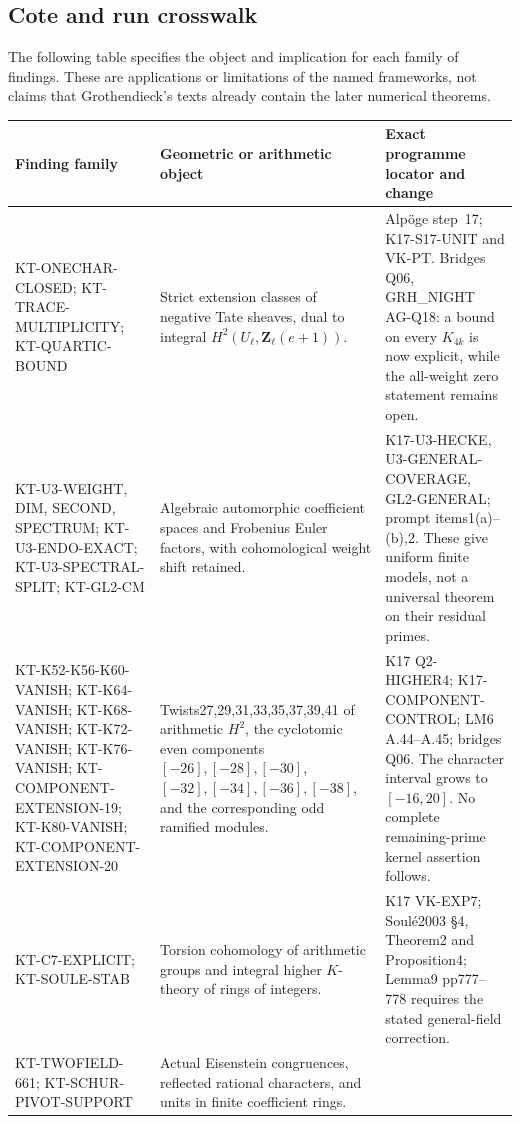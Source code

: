 \documentclass[11pt,a4paper]{article}
\theoremstyle{definition}
\begin{document}
\subsection{Cote and run crosswalk}

The following table specifies the object and implication for
each family of findings. These are applications or limitations
of the named frameworks, not claims that Grothendieck's texts
already contain the later numerical theorems.

\small
\begin{longtable}{>{\raggedright\arraybackslash}p{}
>{\raggedright\arraybackslash}p{}
>{\raggedright\arraybackslash}p{}}
\toprule
Finding family & Geometric or arithmetic object & Exact programme locator and change\\
\midrule\endhead
KT-ONECHAR-CLOSED; KT-TRACE-MULTIPLICITY; KT-QUARTIC-BOUND &
Strict extension classes of negative Tate sheaves, dual to
integral $H^2(U_\ell,\mathbf Z_\ell(e+1))$. &
Alp\"oge step~17; K17-S17-UNIT and VK-PT. Bridges Q06,
GRH\_NIGHT AG-Q18: a bound on every $K_{4k}$ is now explicit,
while the all-weight zero statement remains open.\\
KT-U3-WEIGHT, DIM, SECOND, SPECTRUM; KT-U3-ENDO-EXACT; KT-U3-SPECTRAL-SPLIT; KT-GL2-CM &
Algebraic automorphic coefficient spaces and Frobenius Euler
factors, with cohomological weight shift retained. &
K17-U3-HECKE, U3-GENERAL-COVERAGE, GL2-GENERAL; prompt
items1(a)--(b),2. These give uniform finite models, not a
universal theorem on their residual primes.\\
KT-K52-K56-K60-VANISH; KT-K64-VANISH; KT-K68-VANISH; KT-K72-VANISH;
KT-K76-VANISH; KT-COMPONENT-EXTENSION-19;
KT-K80-VANISH; KT-COMPONENT-EXTENSION-20 &
Twists27,29,31,33,35,37,39,41 of arithmetic $H^2$, the cyclotomic even components
$[-26],[-28],[-30]$, $[-32],[-34],[-36],[-38]$, and the corresponding odd ramified modules. &
K17 Q2-HIGHER4; K17-COMPONENT-CONTROL; LM6 A.44--A.45;
bridges Q06. The character interval grows to $[-16,20]$.
No complete remaining-prime kernel assertion follows.\\
KT-C7-EXPLICIT; KT-SOULE-STAB &
Torsion cohomology of arithmetic groups and integral higher
$K$-theory of rings of integers. &
K17 VK-EXP7; Soul\'e2003 \S4, Theorem2 and Proposition4;
Lemma9 pp777--778 requires the stated general-field correction.\\
KT-TWOFIELD-661; KT-SCHUR-PIVOT-SUPPORT &
Actual Eisenstein congruences, reflected rational characters,
and units in finite coefficient rings. &

\end{longtable}
\end{document}
